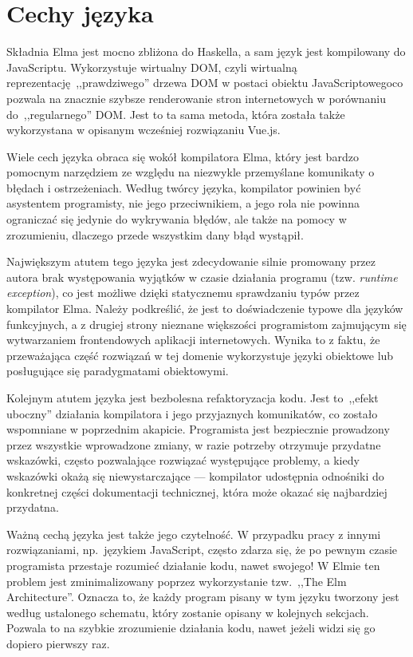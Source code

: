 \documentclass[twoside,a4paper]{report}
\begin{document}
\section{Cechy języka}
Składnia Elma jest mocno zbliżona do Haskella, a sam język jest kompilowany do JavaScriptu.
Wykorzystuje wirtualny DOM, czyli wirtualną reprezentację~,,prawdziwego'' drzewa DOM w postaci obiektu JavaScriptowegoco pozwala na znacznie szybsze renderowanie stron internetowych w porównaniu do~,,regularnego'' DOM\@.
Jest to ta sama metoda, która została także wykorzystana w opisanym wcześniej rozwiązaniu Vue.js.

Wiele cech języka obraca się wokół kompilatora Elma, który jest bardzo pomocnym narzędziem ze względu na niezwykle przemyślane komunikaty o błędach i ostrzeżeniach.
Według twórcy języka, kompilator powinien być asystentem programisty, nie jego przeciwnikiem, a jego rola nie powinna ograniczać się jedynie do wykrywania błędów, ale także na pomocy w zrozumieniu, dlaczego przede wszystkim dany błąd wystąpił.

Największym atutem tego języka jest zdecydowanie silnie promowany przez autora brak występowania wyjątków w czasie działania programu (tzw. \textit{runtime exception}), co jest możliwe dzięki statycznemu sprawdzaniu typów przez kompilator Elma.
Należy podkreślić, że jest to doświadczenie typowe dla języków funkcyjnych, a z drugiej strony nieznane większości programistom zajmującym się wytwarzaniem frontendowych aplikacji internetowych.
Wynika to z faktu, że przeważająca część rozwiązań w tej domenie wykorzystuje języki obiektowe lub posługujące się paradygmatami obiektowymi.

Kolejnym atutem języka jest bezbolesna refaktoryzacja kodu.
Jest to~,,efekt uboczny'' działania kompilatora i jego przyjaznych komunikatów, co zostało wspomniane w poprzednim akapicie.
Programista jest bezpiecznie prowadzony przez wszystkie wprowadzone zmiany, w razie potrzeby otrzymuje przydatne wskazówki, często pozwalające rozwiązać występujące problemy, a kiedy wskazówki okażą się niewystarczające --- kompilator udostępnia odnośniki do konkretnej części dokumentacji technicznej, która może okazać się najbardziej przydatna.

Ważną cechą języka jest także jego czytelność.
W przypadku pracy z innymi rozwiązaniami, np.~językiem JavaScript, często zdarza się, że po pewnym czasie programista przestaje rozumieć działanie kodu, nawet swojego!
W Elmie ten problem jest zminimalizowany poprzez wykorzystanie tzw.~,,The Elm Architecture''.
Oznacza to, że każdy program pisany w tym języku tworzony jest według ustalonego schematu, który zostanie opisany w kolejnych sekcjach.
Pozwala to na szybkie zrozumienie działania kodu, nawet jeżeli widzi się go dopiero pierwszy raz.
\end{document}

